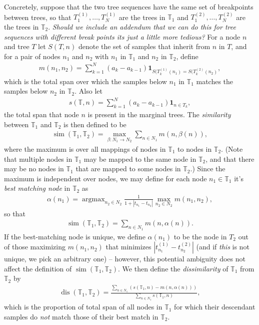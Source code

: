 \documentclass[10pt,twoside,lineno]{gsajnl}
\newcommand{\T}{\mathbb{T}}
\newcommand{\ind}{\mathbf{1}}
\newcommand{\argmax}{\operatorname{argmax}}
\newcommand{\dis}{\operatorname{dis}}
\newcommand{\similarity}{\operatorname{sim}}
\newcommand{\comment}[1]{{\color{violet} \it #1}}
\begin{document}
Concretely, suppose that the two tree sequences have the same set of breakpoints
between trees,
so that $T_1^{(1)}, \ldots, T_N^{(1)}$ are the trees in $\T_1$
and $T_1^{(2)}, \ldots, T_N^{(2)}$ are the trees in $\T_2$.
\comment{Should we include an addendum that we can do this for tree sequences with different break points its just a little more tedious?}
For a node $n$ and tree $T$
let $S(T, n)$ denote the set of samples that inherit from $n$ in $T$,
and for a pair of nodes $n_1$ and $n_2$ with $n_1$ in $\T_1$ and $n_2$ in $\T_2$,
define
\begin{align*}
    m(n_1, n_2)
    =
    \sum_{k=1}^N (a_k - a_{k-1}) \ind_{S(T^{(1)}_k(n_1) = S(T^{(2)}_k(n_2)} ,
\end{align*}
which is the total span over which the samples below $n_1$ in $\T_1$
matches the samples below $n_2$ in $\T_2$.
Also let
\begin{align*}
    s(\T, n) = \sum_{k=1}^N (a_k - a_{k-1}) \ind_{n \in T_k} ,
\end{align*}
the total span that node $n$ is present in the marginal trees.
The \emph{similarity} between $\T_1$ and $\T_2$ is then defined to be
\begin{align*}
    \similarity(\T_1, \T_2)
    =
    \max_{\beta:N_1 \to N_2} \sum_{n \in N_1} m(n, \beta(n)) ,
\end{align*}
where the maximum is over all mappings of nodes in $\T_1$ to nodes in $\T_2$.
(Note that multiple nodes in $\T_1$ may be mapped to the same node in $\T_2$,
and that there may be no nodes in $\T_1$ that are mapped to some nodes in $\T_2$.)
Since the maximum is independent over nodes, we may define for each node $n_1 \in \T_1$
it's \emph{best matching node} in $\T_2$ as
\begin{align*}
    \alpha(n_1) = \argmax_{n_2 \in N_2} \frac{1}{1+|t_{n_1}-t_{n_2}|}\max_{n_2\in N_2} m(n_1, n_2) ,
\end{align*}
so that
\begin{align*}
    \similarity(\T_1, \T_2)
    =
    \sum_{n \in N_1} m(n, \alpha(n)) .
\end{align*}
If the best-matching node is unique, we define $\alpha(n_1)$ to be the node in $T_2$
out of those maximizing $m(n_1, n_2)$ that minimizes $|t^{(1)}_{n_1} - t^{(2)}_{n_2}|$
(and if \emph{this} is not unique, we pick an arbitrary one) --
however, this potential ambiguity does not affect the definition of $\similarity(\T_1, \T_2)$.
We then define the \emph{dissimilarity} of $\T_1$ from $\T_2$ by
\begin{align*}
    \dis(\T_1, \T_2)
    =
    \frac{\sum_{n \in N_1} (s(\T_1, n) - m(n, \alpha(n)))}{\sum_{n\in N_1} s(\T_1,n)} ,
\end{align*}
which is the proportion of total span of all nodes in $\T_1$
for which their descendant samples do \emph{not} match those of their best match in $\T_2$.
\end{document}
